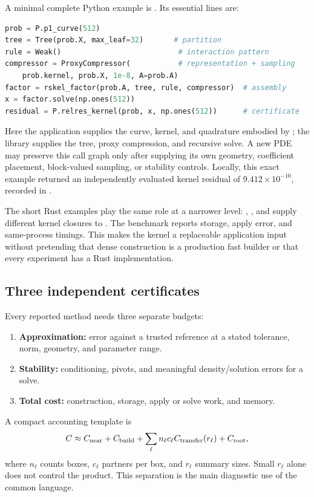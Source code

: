 \documentclass[11pt,a4paper]{article}
\begin{document}
A minimal complete Python example is . Its essential lines are:
\begin{lstlisting}[language=Python]
prob = P.p1_curve(512)
tree = Tree(prob.X, max_leaf=32)       # partition
rule = Weak()                           # interaction pattern
compressor = ProxyCompressor(           # representation + sampling
    prob.kernel, prob.X, 1e-8, A=prob.A)
factor = rskel_factor(prob.A, tree, rule, compressor)  # assembly
x = factor.solve(np.ones(512))
residual = P.relres_kernel(prob, x, np.ones(512))      # certificate
\end{lstlisting}
Here the application supplies the curve, kernel, and quadrature embodied by ; the library supplies the tree, proxy compression, and recursive solve. A new PDE may preserve this call graph only after supplying its own geometry, coefficient placement, block-valued sampling, or stability controls. Locally, this exact example returned an independently evaluated kernel residual of $9.412\times10^{-10}$, recorded in .

The short Rust examples play the same role at a narrower level: , , and  supply different kernel closures to . The benchmark reports storage, apply error, and same-process timings. This makes the kernel a replaceable application input without pretending that dense construction is a production fast builder or that every experiment has a Rust implementation.

\subsection{Three independent certificates}
Every reported method needs three separate budgets:
\begin{enumerate}
\item \textbf{Approximation:} error against a trusted reference at a stated tolerance, norm, geometry, and parameter range.
\item \textbf{Stability:} conditioning, pivots, and meaningful density/solution errors for a solve.
\item \textbf{Total cost:} construction, storage, apply or solve work, and memory.
\end{enumerate}
A compact accounting template is
\begin{equation}
 C\approx C_{\rm near}+C_{\rm build}
 +\sum_\ell n_\ell c_\ell C_{\rm transfer}(r_\ell)+C_{\rm root},
 \label{eq:costaccounting}
\end{equation}
where $n_\ell$ counts boxes, $c_\ell$ partners per box, and $r_\ell$ summary sizes. Small $r_\ell$ alone does not control the product. This separation is the main diagnostic use of the common language.
\end{document}
